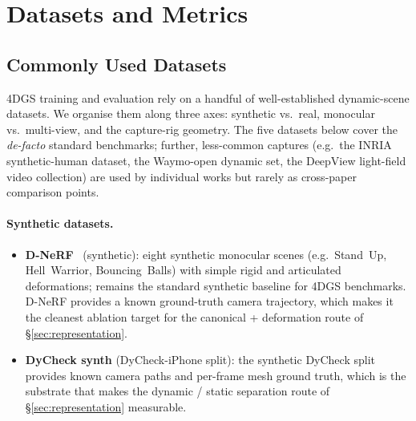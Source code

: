 
\section{Datasets and Metrics}
\label{sec:datasets}

\subsection{Commonly Used Datasets}
4DGS training and evaluation rely on a handful of well-established
dynamic-scene datasets. We organise them along three axes:
synthetic vs.\ real, monocular vs.\ multi-view, and the
capture-rig geometry. The five datasets below cover the
\emph{de-facto} standard benchmarks; further, less-common
captures (e.g.\ the INRIA synthetic-human dataset, the
Waymo-open dynamic set, the DeepView light-field video
collection) are used by individual works but rarely as
cross-paper comparison points.

\paragraph{Synthetic datasets.}
\begin{itemize}
  \item \textbf{D-NeRF}~\cite{pumarola2021dnerf} (synthetic): eight
        synthetic monocular scenes (e.g.\ Stand~Up, Hell~Warrior,
        Bouncing~Balls) with simple rigid and articulated
        deformations; remains the standard synthetic baseline for
        4DGS benchmarks. D-NeRF provides a known ground-truth camera
        trajectory, which makes it the cleanest ablation target
        for the canonical + deformation route of
        \S\ref{sec:representation}.
  \item \textbf{DyCheck synth} (DyCheck-iPhone split): the
        synthetic DyCheck split provides known camera paths and
        per-frame mesh ground truth, which is the substrate that
        makes the dynamic / static separation route of
        \S\ref{sec:representation} measurable.
\end{itemize}

